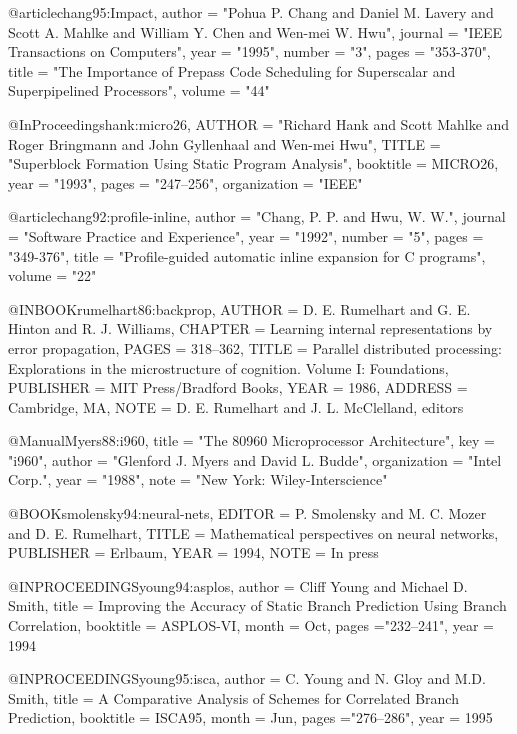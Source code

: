 @article{chang95:Impact,
	author =	"Pohua P. Chang and Daniel M. Lavery and Scott A. Mahlke and William Y. Chen and Wen-mei W. Hwu",
	journal =	"IEEE Transactions on Computers",
	year =		"1995",
	number =	"3",
	pages =		"353-370",
	title =		"The Importance of Prepass Code Scheduling for Superscalar and Superpipelined Processors",
	volume =	"44"
}


@InProceedings{hank:micro26,
        AUTHOR = "Richard Hank and Scott Mahlke and Roger Bringmann and John Gyllenhaal and Wen-mei Hwu",
        TITLE = "Superblock Formation Using Static Program Analysis",
        booktitle = MICRO26,
        year =   "1993",
        pages = "247--256",
        organization = "IEEE"
}


@article{chang92:profile-inline,
	author =	"Chang, P. P. and Hwu, W. W.",
	journal =	"Software Practice and Experience",
	year =		"1992",
	number =	"5",
	pages =		"349-376",
	title =		"Profile-guided automatic inline expansion for {C} programs",
	volume =	"22"
}

@INBOOK{rumelhart86:backprop,
	AUTHOR = {D. E. Rumelhart and G. E. Hinton and R. J. Williams},
	CHAPTER = {Learning internal representations by error propagation},
	PAGES = {318--362},
	TITLE = {Parallel distributed processing:  
		 Explorations in the microstructure of cognition.  
		 Volume I:  Foundations},
	PUBLISHER = {MIT Press/Bradford Books},
	YEAR = {1986},
	ADDRESS = {Cambridge, MA},
	NOTE = {D. E. Rumelhart and J. L. McClelland, editors}
}

@Manual{Myers88:i960,
  title = 	 "The 80960 Microprocessor Architecture",
  key = 	 "i960",
  author = 	 "Glenford J. Myers and David L. Budde",
  organization = "Intel Corp.",
  year = 	 "1988",
  note = 	 "New York: Wiley-Interscience"
}


@BOOK{smolensky94:neural-nets,
	EDITOR = {P. Smolensky and  M. C.  Mozer and D. E. Rumelhart},
	TITLE = {Mathematical perspectives on neural networks},
	PUBLISHER = {Erlbaum},
	YEAR = {1994},
	NOTE = {In press}
}

@INPROCEEDINGS{young94:asplos,
           author = {Cliff Young and Michael D. Smith},
           title = {Improving the Accuracy of Static
Branch Prediction Using Branch  Correlation},
	   booktitle = ASPLOS-VI,
           month = Oct,
           pages ="232--241",
	   year = 1994
}


@INPROCEEDINGS{young95:isca,
           author = {C. Young and N. Gloy and M.D. Smith},
           title = {A Comparative Analysis of Schemes for Correlated Branch Prediction},
	   booktitle = ISCA95,
           month = Jun,
           pages ="276--286",
	   year = 1995
}


